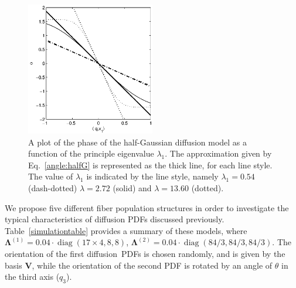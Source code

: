 \documentclass[authoryear,preprint,12pt]{elsarticle}
\DeclareMathOperator*{\diag}{diag}
\newcommand{\q}{\mathbf{q}}
\newcommand{\bsL}{\bs{\Lambda}}
\newcommand{\bld}[1]{\mathbf{#1}}
\newcommand{\bs}[1]{\boldsymbol{#1}}
\begin{document}
\begin{figure}[!htbp]
  \begin{center}
    \includegraphics[width=0.5\textwidth]{phase1.eps}
  \end{center}
  \caption{A plot of the phase of the half-Gaussian diffusion model as
    a function of the principle eigenvalue $\lambda_1$.  The
    approximation given by Eq.~\eqref{angle:halfG} is represented as
    the thick line, for each line style.  The value of $\lambda_1$ is
    indicated by the line style, namely $\lambda_1=0.54$ (dash-dotted)
    $\lambda=2.72$ (solid) and $\lambda=13.60$ (dotted).}
  \label{phaseplot}
\end{figure}

We propose five different fiber population structures in order to
investigate the typical characteristics of diffusion PDFs discussed
previously.  Table~\ref{simulationtable} provides a summary of these
models, where $\bsL^{(1)}=0.04\cdot\diag(17\times4,8,8)$,
$\bsL^{(2)}=0.04\cdot\diag(84/3,84/3,84/3)$.  The orientation of the
first diffusion~PDFs is chosen randomly, and is given by the basis
$\bld{V}$, while the orientation of the second PDF is rotated by an
angle of $\theta$ in the third axis ($q_3$).
\end{document}
